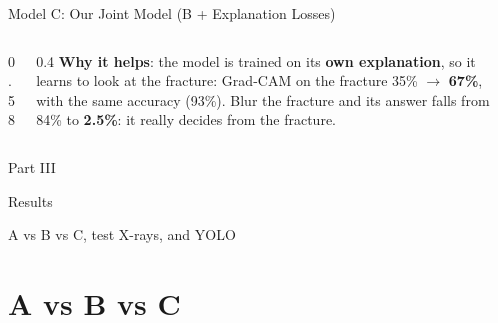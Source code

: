 \documentclass[aspectratio=169,10pt]{beamer}
\newcommand{\partslide}[3]{%
  \begin{frame}[plain]
    \vfill\centering
    {\large Part #1}\par\vspace{1.0em}
    {\usebeamerfont{title}\color{navy}#2\par}\vspace{1.0em}
    {\normalsize #3\par}
    \vfill
  \end{frame}}
\begin{document}
\begin{frame}{Model C: Our Joint Model (B + Explanation Losses)}
\begin{columns}[T]
\begin{column}{0.58\textwidth}
    \end{column}
    \begin{column}{0.4\textwidth}
      \footnotesize
      \vspace*{3.2em}
      \textbf{Why it helps}: the model is trained on its \textbf{own explanation}, so it learns to look at the
      fracture: Grad-CAM on the fracture 35\% $\to$ \textbf{67\%}, with the same accuracy (93\%).
      Blur the fracture and its answer falls from 84\% to \textbf{2.5\%}: it really decides from the fracture.
    \end{column}
  \end{columns}
\end{frame}

\partslide{III}{Results}{A vs B vs C, test X-rays, and YOLO}
\section{A vs B vs C}
\end{document}
